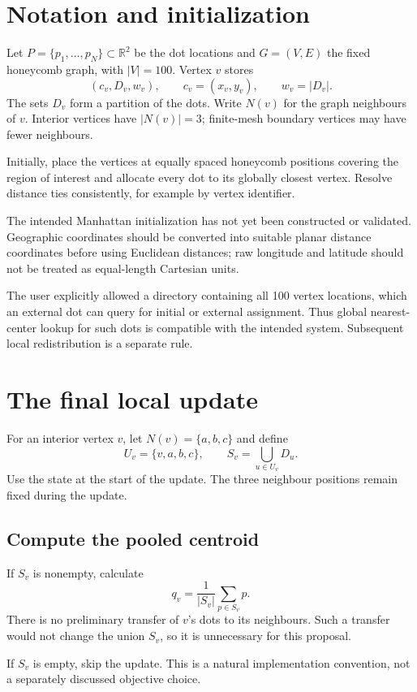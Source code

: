 \documentclass[11pt]{article}
\begin{document}
\section{Notation and initialization}
Let $P=\{p_1,\ldots,p_N\}\subset\mathbb R^2$ be the dot locations and $G=(V,E)$ the fixed honeycomb graph, with $|V|=100$. Vertex $v$ stores
\[
(c_v,D_v,w_v),\qquad c_v=(x_v,y_v),\qquad w_v=|D_v|.
\]
The sets $D_v$ form a partition of the dots. Write $N(v)$ for the graph neighbours of $v$. Interior vertices have $|N(v)|=3$; finite-mesh boundary vertices may have fewer neighbours.

Initially, place the vertices at equally spaced honeycomb positions covering the region of interest and allocate every dot to its globally closest vertex. Resolve distance ties consistently, for example by vertex identifier.

The intended Manhattan initialization has not yet been constructed or validated. Geographic coordinates should be converted into suitable planar distance coordinates before using Euclidean distances; raw longitude and latitude should not be treated as equal-length Cartesian units.

The user explicitly allowed a directory containing all 100 vertex locations, which an external dot can query for initial or external assignment. Thus global nearest-center lookup for such dots is compatible with the intended system. Subsequent local redistribution is a separate rule.

\section{The final local update}
For an interior vertex $v$, let $N(v)=\{a,b,c\}$ and define
\[
U_v=\{v,a,b,c\},\qquad S_v=\bigcup_{u\in U_v}D_u.
\]
Use the state at the start of the update. The three neighbour positions remain fixed during the update.

\subsection{Compute the pooled centroid}
If $S_v$ is nonempty, calculate
\[
q_v=\frac{1}{|S_v|}\sum_{p\in S_v}p.
\]
There is no preliminary transfer of $v$'s dots to its neighbours. Such a transfer would not change the union $S_v$, so it is unnecessary for this proposal.

If $S_v$ is empty, skip the update. This is a natural implementation convention, not a separately discussed objective choice.
\end{document}

